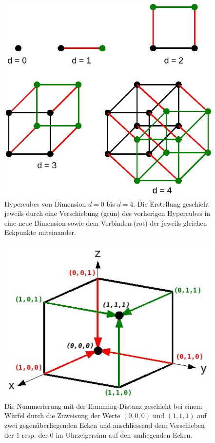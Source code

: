 \begin{figure}[H]
  \centering
  \includegraphics[width=0.6\linewidth]{images/theorie/hyper-sample}
  \caption[Hypercubes von Dimension 0 bis 4]{Hypercubes von Dimension $d=0$ bis $d=4$. Die Erstellung geschieht jeweils durch eine Verschiebung (gr\"un) des vorherigen Hypercubes in eine neue Dimension sowie dem Verbinden (rot) der jeweils gleichen Eckpunkte miteinander.}
  \label{fig:hyper-sample}
\end{figure}

\begin{figure}[H]
  \centering
  \includegraphics[width=0.6\linewidth]{images/theorie/hyper-hamming-4}
  \caption[Hamming-Distanz bei einem Hypercube zur Nummerierung der Nodes]{Die Nummerierung mit der Hamming-Distanz geschieht bei einem W\"urfel durch die Zuweisung der Werte $(0,0,0)$ und $(1,1,1)$ auf zwei gegen\"uberliegenden Ecken und anschliessend dem Verschieben der $1$ resp. der $0$ im Uhrzeigersinn auf den umliegenden Ecken.}
  \label{fig:hyper-hamming-num}
\end{figure}

